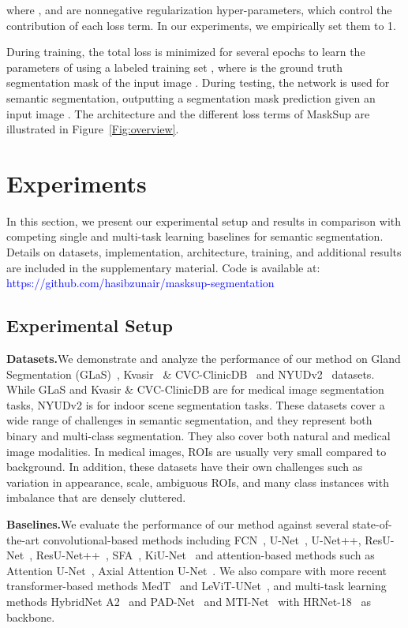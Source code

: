 \documentclass{bmvc2k}
\begin{document}
where ,  and  are nonnegative regularization hyper-parameters, which control the contribution of each loss term. In our experiments, we empirically set them to 1.

During training, the total loss  is minimized for several epochs to learn the parameters of  using a labeled training set , where  is the ground truth segmentation mask of the input image . During testing, the network  is used for semantic segmentation, outputting a segmentation mask prediction  given an input image . The architecture and the different loss terms of MaskSup are illustrated in Figure~\ref{Fig:overview}.

\section{Experiments}
In this section, we present our experimental setup and results in comparison with competing single and multi-task learning baselines for semantic segmentation. Details on datasets, implementation, architecture, training, and additional results are included in the supplementary material. Code is available at: \textcolor{blue}{https://github.com/hasibzunair/masksup-segmentation}

\subsection{Experimental Setup}
\noindent\textbf{Datasets.}\quad We demonstrate and analyze the performance of our method on Gland Segmentation (GLaS)~\cite{sirinukunwattana2017gland}, Kvasir~\cite{jha2020kvasir} \& CVC-ClinicDB~\cite{bernal2015wm} and NYUDv2~\cite{Silberman:ECCV12} datasets. While GLaS and Kvasir \& CVC-ClinicDB are for medical image segmentation tasks, NYUDv2 is for indoor scene segmentation tasks. These datasets cover a wide range of challenges in semantic segmentation, and they represent both binary and multi-class segmentation. They also cover both natural and medical image modalities. In medical images, ROIs are usually very small compared to background. In addition, these datasets have their own challenges such as variation in appearance, scale, ambiguous ROIs, and many class instances with imbalance that are densely cluttered.

\medskip\noindent\textbf{Baselines.}\quad We evaluate the performance of our method against several state-of-the-art convolutional-based methods including FCN~\cite{long2015fully}, U-Net~\cite{ronneberger2015u}, U-Net++\cite{zhou2019unet++}, ResU-Net~\cite{xiao2018weighted}, ResU-Net++~\cite{jha2019resunet++}, SFA~\cite{fang2019selective}, KiU-Net~\cite{valanarasu2021kiu} and attention-based methods such as Attention U-Net~\cite{oktay2018attention}, Axial Attention U-Net~\cite{wang2020axial}. We also compare with more recent transformer-based methods MedT~\cite{valanarasu2021medical} and LeViT-UNet~\cite{xu2021levit}, and multi-task learning methods HybridNet A2~\cite{lin2019depth} and PAD-Net~\cite{xu2018pad} and MTI-Net~\cite{vandenhende2020mti} with HRNet-18~\cite{wang2020deep} as backbone.
\end{document}
